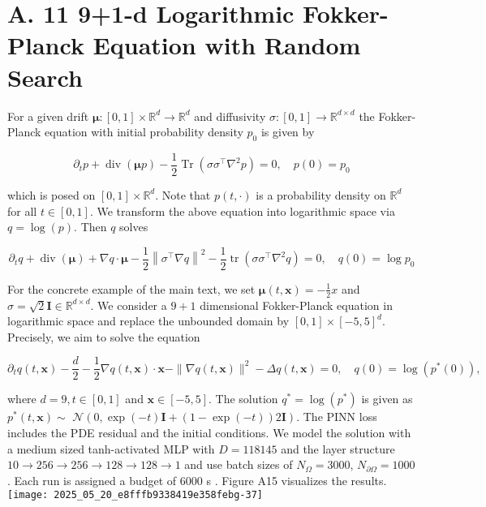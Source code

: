 \documentclass[10pt]{article}
\begin{document}
\section*{A. 11 9+1-d Logarithmic Fokker-Planck Equation with Random Search}
For a given drift $\boldsymbol{\mu}:[0,1] \times \mathbb{R}^{d} \rightarrow \mathbb{R}^{d}$ and diffusivity $\sigma:[0,1] \rightarrow \mathbb{R}^{d \times d}$ the Fokker-Planck equation with initial probability density $p_{0}$ is given by

$$
\partial_{t} p+\operatorname{div}(\boldsymbol{\mu} p)-\frac{1}{2} \operatorname{Tr}\left(\sigma \sigma^{\top} \nabla^{2} p\right)=0, \quad p(0)=p_{0}
$$

which is posed on $[0,1] \times \mathbb{R}^{d}$. Note that $p(t, \cdot)$ is a probability density on $\mathbb{R}^{d}$ for all $t \in[0,1]$. We transform the above equation into logarithmic space via $q=\log (p)$. Then $q$ solves

$$
\partial_{t} q+\operatorname{div}(\boldsymbol{\mu})+\nabla q \cdot \boldsymbol{\mu}-\frac{1}{2}\left\|\sigma^{\top} \nabla q\right\|^{2}-\frac{1}{2} \operatorname{tr}\left(\sigma \sigma^{\top} \nabla^{2} q\right)=0, \quad q(0)=\log p_{0}
$$

For the concrete example of the main text, we set $\boldsymbol{\mu}(t, \boldsymbol{x})=-\frac{1}{2} x$ and $\sigma=\sqrt{2} \boldsymbol{I} \in \mathbb{R}^{d \times d}$. We consider a $9+1$ dimensional Fokker-Planck equation in logarithmic space and replace the unbounded domain by $[0,1] \times[-5,5]^{d}$. Precisely, we aim to solve the equation

$$
\partial_{t} q(t, \boldsymbol{x})-\frac{d}{2}-\frac{1}{2} \nabla q(t, \boldsymbol{x}) \cdot \boldsymbol{x}-\|\nabla q(t, \boldsymbol{x})\|^{2}-\Delta q(t, \boldsymbol{x})=0, \quad q(0)=\log \left(p^{*}(0)\right),
$$

where $d=9, t \in[0,1]$ and $\boldsymbol{x} \in[-5,5]$. The solution $q^{*}=\log \left(p^{*}\right)$ is given as $p^{*}(t, \boldsymbol{x}) \sim$ $\mathcal{N}(0, \exp (-t) \boldsymbol{I}+(1-\exp (-t)) 2 \boldsymbol{I})$. The PINN loss includes the PDE residual and the initial conditions. We model the solution with a medium sized tanh-activated MLP with $D=118145$ and the layer structure $10 \rightarrow 256 \rightarrow 256 \rightarrow 128 \rightarrow 128 \rightarrow 1$ and use batch sizes of $N_{\Omega}=3000$, $N_{\partial \Omega}=1000$. Each run is assigned a budget of 6000 s . Figure A15 visualizes the results.\\
\texttt{[image: 2025\_05\_20\_e8fffb9338419e358febg-37]}
\end{document}
